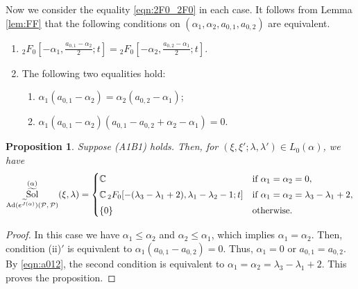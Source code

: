 \documentclass[a4paper,11pt,reqno]{amsart}
\newcommand{\calP}{\mathcal{P}}
\newcommand{\0}{{\bf 0}}
\newcommand{\C}{\mathbb{C}}
\newcommand{\1}{{\bf 1}}
\DeclareMathOperator{\Ad}{Ad}
\DeclareMathOperator{\Sol}{Sol}
\newcommand{\wJ}{\widetilde{J}}
\DeclareMathOperator{\wSol}{\widetilde{\Sol}}
\theoremstyle{plain}
\newtheorem{proposition}[equation]{Proposition}
\theoremstyle{definition}
\numberwithin{equation}{section}
\theoremstyle{definition}
\begin{document}
Now we consider the equality \eqref{eqn:2F0_2F0} in each case. 
It follows from Lemma \ref{lem:FF} that the following conditions on 
$(\alpha_1, \alpha_2, a_{0,1}, a_{0,2})$ are equivalent.
\begin{enumerate}
\item[\textnormal{(i)}$'$] 
${}_2F_0[-\alpha_1, \tfrac{a_{0,1}-\alpha_2}{2};t]
=
{}_2F_0[-\alpha_2, \tfrac{a_{0,2}-\alpha_1}{2};t]
$.
\item[\textnormal{(ii)}$'$] 
The following two equalities hold:
\begin{enumerate}
\item[\textnormal{(ii-a)}$'$]
$\alpha_1(a_{0,1}-\alpha_2)=\alpha_2(a_{0,2}-\alpha_1)$;
\item[\textnormal{(ii-b)}$'$] 
$\alpha_1(a_{0,1}-\alpha_2)(a_{0,1}-a_{0,2}+\alpha_2-\alpha_1)=0$.
\end{enumerate}
\end{enumerate}



\begin{proposition}\label{prop:A1B1}
Suppose \textnormal{(A1B1)} holds.
Then, for $(\xi,\xi';\lambda,\lambda')\in L_0(\alpha)$,
we have 
\begin{equation*}
\wSol_{\Ad(e^{\wJ(\alpha)})(\calP,\, \calP)}^{(\alpha)}(\xi,\lambda)
=
\begin{cases}
\C &\textnormal{if $\alpha_1=\alpha_2=0$},\\[3pt]
\C\,{}_2F_0[-(\lambda_3-\lambda_1+2),\lambda_1-\lambda_2-1;t]
&\textnormal{if $\alpha_1=\alpha_2=\lambda_3-\lambda_1+2$},\\[3pt]
\{0\} & \textnormal{otherwise}.
\end{cases}
\end{equation*}
\end{proposition}

\begin{proof}
In this case we have $\alpha_1 \leq \alpha_2$ and 
$\alpha_2 \leq \alpha_1$, which implies
$\alpha_1=\alpha_2$. 
Then, condition (ii)$'$ is equivalent to $\alpha_1 (a_{0,1}-a_{0,2})=0$. Thus, $\alpha_1=0$ or 
$a_{0,1}=a_{0,2}$. By \eqref{eqn:a012}, 
the second condition is equivalent to 
$\alpha_1=\alpha_2 = \lambda_3-\lambda_1+2$.
This proves the proposition.
\end{proof}
\end{document}
